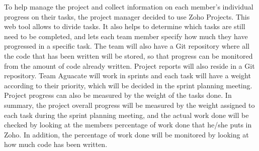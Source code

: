 
To help manage the project and collect information on each member's individual
progress on their tasks, the project manager decided to use Zoho Projects. This
web tool allows to divide tasks. It also helps to determine which tasks are
still need to be completed, and lets each team member specify how much they have
progressed in a specific task. The team will also have a Git repository where
all the code that has been written will be stored, so that progress can be
monitored from the amount of code already written. Project reports will also
reside in a Git repository. Team Aguacate will work in sprints and each task
will have a weight according to their priority, which will be decided in the
sprint planning meeting. Project progress can also be measured by the weight of
the tasks done. In summary, the project overall progress will be measured by the weight assigned to each task during the sprint planning meeting, and the actual work done will be checked by looking at the members percentage of work done that he/she puts in Zoho. In addition, the percentage of work done will be monitored by looking at how much code has been written.

